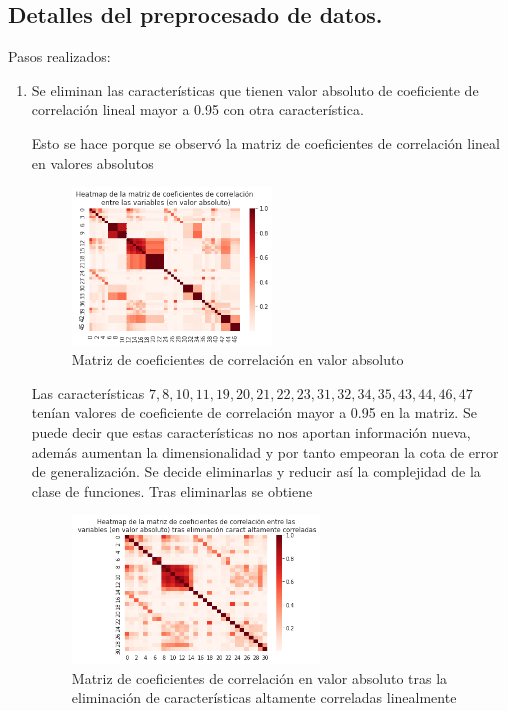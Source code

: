 \documentclass[11pt,a4paper]{article}
\theoremstyle{definition}
\begin{document}
	\subsection{Detalles del preprocesado de datos.}
	Pasos realizados:
	\begin{enumerate}
		\item Se eliminan las características que tienen valor absoluto de coeficiente de correlación lineal mayor a 0.95 con otra característica. %
		
		Esto se hace porque se observó la matriz de coeficientes de correlación lineal en valores absolutos
		\begin{figure}[H]
		\centering
		\includegraphics[width=0.5\textwidth]{images/corr_matrix}
		\caption{Matriz de coeficientes de correlación en valor absoluto}
		\end{figure}
		Las características $7, 8, 10, 11, 19, 20, 21, 22, 23, 31, 32, 34, 35, 43, 44, 46, 47$ tenían valores de coeficiente de correlación mayor a 0.95 en la matriz. Se puede decir que estas características no nos aportan información nueva, además aumentan la dimensionalidad y por tanto empeoran la cota de error de generalización. Se decide eliminarlas y reducir así la complejidad de la clase de funciones. Tras eliminarlas se obtiene
		\begin{figure}[H]
		\centering
		\includegraphics[width=0.62\textwidth]{images/corr_matrix_post}
		\caption{Matriz de coeficientes de correlación en valor absoluto tras la eliminación de características altamente correladas linealmente}

\end{figure}
\end{enumerate}
\end{document}

